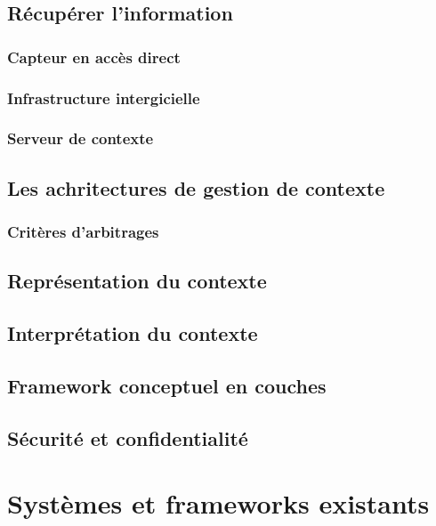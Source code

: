\subsection{Récupérer l'information}

\subsubsection{Capteur en accès direct}

\subsubsection{Infrastructure intergicielle}

\subsubsection{Serveur de contexte}

\subsection{Les achritectures de gestion de contexte}

\subsubsection{Critères d'arbitrages}

\subsection{Représentation du contexte}

\subsection{Interprétation du contexte}

\subsection{Framework conceptuel en couches}

\subsection{Sécurité et confidentialité}

\section{Systèmes et frameworks existants}

